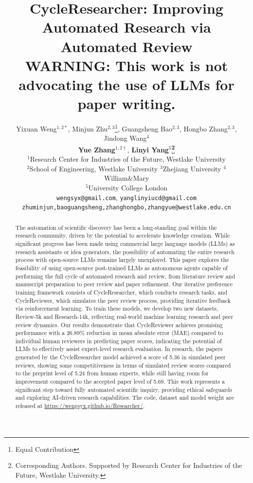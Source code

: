 \documentclass{article} %
\title{CycleResearcher: Improving Automated Research via Automated Review
\\ {\color{warningcolor} \normalsize WARNING: This work is not advocating the use of LLMs for paper writing.}}
\author{Yixuan Weng$^{1,2*}$, Minjun Zhu$^{2,3}$\thanks{Equal Contribution}, Guangsheng Bao$^{2,3}$, Hongbo Zhang$^{2,3}$, Jindong Wang$^{4}$ \\
\textbf{Yue Zhang$^{1,2\dagger}$}, \textbf{Linyi Yang$^{5}$\thanks{Corresponding Authors. Supported by Research Center for Industries of the Future, Westlake University.}} \\
$^{1}$Research Center for Industries of the Future, Westlake University\\$^{2}$School of Engineering, Westlake University $^{3}$Zhejiang University $^{4}$ William\&Mary\\ $^{5}$University College London\\
\texttt{wengsyx@gmail.com}, \texttt{yanglinyiucd@gmail.com}\\
\texttt{zhuminjun,baoguangsheng,zhanghongbo,zhangyue@westlake.edu.cn}}
\begin{document}

\maketitle

\begin{abstract}

The automation of scientific discovery has been a long-standing goal within the research community, driven by the potential to accelerate knowledge creation. While significant progress has been made using commercial large language models (LLMs) as research assistants or idea generators, the possibility of automating the entire research process with open-source LLMs remains largely unexplored. This paper explores the feasibility of using open-source post-trained LLMs as autonomous agents capable of performing the full cycle of automated research and review, from literature review and manuscript preparation to peer review and paper refinement. Our iterative preference training framework consists of CycleResearcher, which conducts research tasks, and CycleReviewer, which simulates the peer review process, providing iterative feedback via reinforcement learning. To train these models, we develop two new datasets, Review-5k and Research-14k, reflecting real-world machine learning research and peer review dynamics. Our results demonstrate that CycleReviewer achieves promising performance with a 26.89\% reduction in mean absolute error (MAE) compared to individual human reviewers in predicting paper scores, indicating the potential of LLMs to effectively assist expert-level research evaluation. In research, the papers generated by the CycleResearcher model achieved a score of 5.36 in simulated peer reviews, showing some competitiveness in terms of simulated review scores compared to the preprint level of 5.24 from human experts, while still having room for improvement compared to the accepted paper level of 5.69. This work represents a significant step toward fully automated scientific inquiry, providing ethical safeguards and exploring AI-driven research capabilities. The code, dataset and model weight are released at \url{https://wengsyx.github.io/Researcher/}.


\end{abstract}
\end{document}
